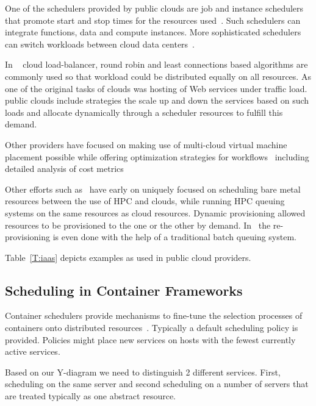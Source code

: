 \documentclass[final,5p,times,twocolumn]{elsarticle}
\begin{document}
One of the schedulers provided by public clouds are job and instance
schedulers that promote start and stop times for the resources
used~\cite{AWSIns2019,AzureSch2019,Rackspace2016,GoogleAppEngine2018}. Such
schedulers can integrate functions, data and compute instances. More
sophisticated schedulers can switch workloads between cloud data
centers~\cite{MicrosoftAzure2014}.

In ~\cite{Rackspace2016} cloud load-balancer, round robin and least
connections based algorithms are commonly used so that workload could
be distributed equally on all resources.  As one of the original tasks
of clouds was hosting of Web services under traffic load. public
clouds include strategies the scale up and down the services based on
such loads and allocate dynamically through a scheduler resources to
fulfill this demand.

Other providers have focused on making use of multi-cloud virtual
machine placement possible while offering optimization strategies for
workflows~\cite{CloudSigma2016} including detailed analysis of cost
metrics~\cite{Cloudmetrics2019}

Other efforts such as~\cite{las12fg-bookchapter,fox2013futuregrid}
have early on uniquely focused on scheduling bare metal resources
between the use of HPC and clouds, while running HPC queuing systems
on the same resources as cloud resources. Dynamic provisioning allowed
resources to be provisioned to the one or the other by
demand. In~\cite{las-comet} the re-provisioning is even done with the
help of a traditional batch queuing system.

Table~\ref{T:iaas} depicts examples as used in public cloud providers.






\subsection{Scheduling in Container Frameworks}
\label{sec:container}


Container schedulers provide mechanisms to fine-tune the selection
processes of containers onto distributed
resources~\cite{Containers2018,de2018distributed}. Typically a default
scheduling policy is provided. Policies might place new services on
hosts with the fewest currently active services.

Based on our Y-diagram we need to distinguish 2 different
services. First, scheduling on the same server and second scheduling
on a number of servers that are treated typically as one abstract
resource.
\end{document}
